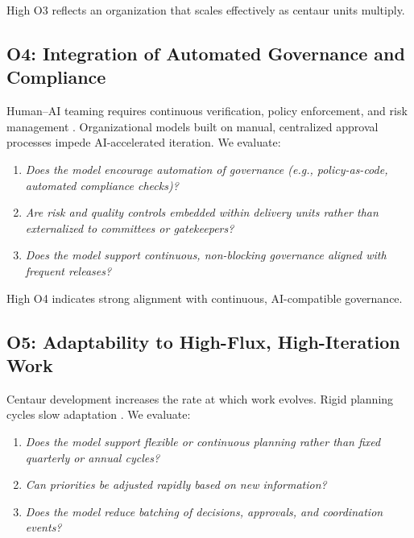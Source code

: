 \documentclass[11pt, a4paper, twocolumn]{article} %
\begin{document}
High O3 reflects an organization that scales effectively as centaur units
multiply.

\newpage

\subsection*{O4: Integration of Automated Governance and Compliance}

Human--AI teaming requires continuous verification, policy enforcement, and
risk management \citep{shneiderman2020human,schmutz2024aiteaming}. Organizational
models built on manual, centralized approval processes impede AI-accelerated
iteration. We evaluate:

\begin{enumerate}[label=O4.\arabic*), leftmargin=*]
    \item \emph{Does the model encourage automation of governance
    (e.g., policy-as-code, automated compliance checks)?}
    \item \emph{Are risk and quality controls embedded within delivery units
    rather than externalized to committees or gatekeepers?}
    \item \emph{Does the model support continuous, non-blocking governance
    aligned with frequent releases?}
\end{enumerate}

High O4 indicates strong alignment with continuous, AI-compatible governance.

\subsection*{O5: Adaptability to High-Flux, High-Iteration Work}

Centaur development increases the rate at which work evolves. Rigid planning
cycles slow adaptation \citep{ries2011lean,forsgren2018accelerate}. We evaluate:

\begin{enumerate}[label=O5.\arabic*), leftmargin=*]
    \item \emph{Does the model support flexible or continuous planning rather
    than fixed quarterly or annual cycles?}
    \item \emph{Can priorities be adjusted rapidly based on new information?}
    \item \emph{Does the model reduce batching of decisions, approvals, and
    coordination events?}
\end{enumerate}
\end{document}
